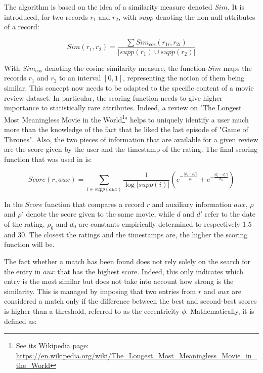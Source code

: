 The algorithm is based on the idea of a similarity measure denoted $Sim$. It is introduced, for two records $r_1$ and $r_2$, with $supp$ denoting the non-null attributes of a record:

\begin{equation}
	Sim(r_1, r_2) = \frac{\sum Sim_{\text{cos}}(r_{1i}, r_{2i})}{\lvert supp(r_1) \cup supp(r_2) \rvert}
\end{equation} 

With $Sim_{\text{cos}}$ denoting the cosine similarity measure, the function $Sim$ maps the records $r_1$ and $r_2$ to an interval $[0,1]$, representing the notion of them being similar. This concept now needs to be adapted to the specific content of a movie review dataset. In particular, the scoring function needs to give higher importance to statistically rare attributes. Indeed, a review on "The Longest Most Meaningless Movie in the World\footnote{See its Wikipedia page: \url{https://en.wikipedia.org/wiki/The_Longest_Most_Meaningless_Movie_in_the_World}}" helps to uniquely identify a user much more than the knowledge of the fact that he liked the last episode of "Game of Thrones". Also, the two pieces of information that are available for a given review are the score given by the user and the timestamp of the rating. The final scoring function that was used in \cite{netflix} is:

\begin{equation}\label{eq:score}
	Score(r,aux) = \sum_{i \in supp(aux)} \frac{1}{\log\lvert supp(i) \rvert} \left( e^{-\frac{ \lvert \rho_i - \rho_i'  \rvert}{\rho_0}} + e^{-\frac{\lvert d_i - d_i' \rvert}{d_0}}\right)
\end{equation}

In the $Score$ function that compares a record $r$ and auxiliary information $aux$, $\rho$ and $\rho'$ denote the score given to the same movie, while $d$ and $d'$ refer to the date of the rating. $\rho_0$ and $d_0$ are constants empirically determined to respectively 1.5 and 30. The closest the ratings and the timestamps are, the higher the scoring function will be.

The fact whether a match has been found does not rely solely on the search for the entry in $aux$ that has the highest score. Indeed, this only indicates which entry is the most similar but does not take into account how strong is the similarity. This is managed by imposing that two entries from $r$ and $aux$ are considered a match only if the difference between the best and second-best scores is higher than a threshold, referred to as the eccentricity $\phi$. Mathematically, it is defined as:

